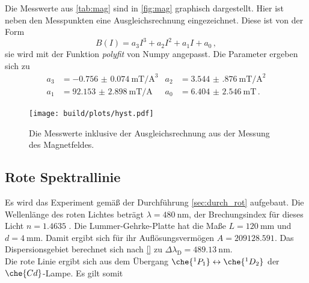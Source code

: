   \noindent Die Messwerte aus \autoref{tab:mag} sind in \autoref{fig:mag} graphisch dargestellt. Hier ist neben den Messpunkten eine 
  Ausgleichsrechnung eingezeichnet. Diese ist von der Form 
  \begin{equation}
    B(I) = a_3 I^3 + a_2 I^2 + a_1 I + a_0\, ,
    \label{eqn:bfield}
  \end{equation}
  sie wird mit der Funktion \textit{polyfit} von Numpy angepasst. Die Parameter ergeben sich zu 
  \begin{align*}
    a_3 & = \SI{-0.756(74)}{\milli\tesla\per\ampere\tothe{3}} & a_2 & = \SI{3.544(876)}{\milli\tesla\per\ampere\squared} \\
    a_1 & = \SI{92.153(2898)}{\milli\tesla\per\ampere} & a_0 & = \SI{6.404(2546)}{\milli\tesla}  \, .
  \end{align*}

  \begin{figure}%
    \centering%
    \texttt{[image: build/plots/hyst.pdf]}%
    \caption{Die Messwerte inklusive der Ausgleichsrechnung aus der Messung des Magnetfeldes.}%
    \label{fig:mag}%
  \end{figure}%

\subsection{Rote Spektrallinie}

  \noindent Es wird das Experiment gemäß der Durchführung \ref{sec:durch_rot} aufgebaut. Die Wellenlänge des roten Lichtes beträgt 
  $\lambda = \SI{480}{\nano\metre}$, der Brechungsindex für dieses Licht $n = \num{1.4635}$ \cite{V27}. Die Lummer-Gehrke-Platte hat die 
  Maße $L = \SI{120}{\milli\metre}$ und $d = \SI{4}{\milli\metre}$. Damit ergibt sich für ihr Auflösungsvermögen $ A = \num{209128.591}$. 
  Das Dispersionsgebiet berechnet sich nach \eqref{} zu $\Delta \lambda_\text{D} = \SI{489.13}{\nano\metre}$. \\ 
  
  \noindent 
  Die rote Linie ergibt sich aus dem Übergang $\che{^1P_1} \leftrightarrow \che{^1D_2}$ der $\che{Cd}$-Lampe. Es gilt somit 
  \begin{table}
    \centering
    \begin{tabular}{c c c c c}
      \toprule
      
      
    \end{tabular}
  \end{table}

